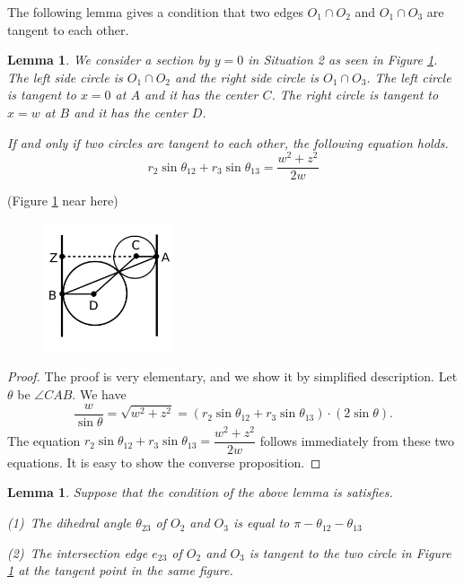 \documentclass[suppldata, dvipdfmx]{interact}
\theoremstyle{plain}%
\newtheorem{lemma}[theorem]{Lemma}
\theoremstyle{definition}
\theoremstyle{remark}
\theoremstyle{problemstyle}
\begin{document}
The following lemma gives a condition that two edges $O_1\cap O_2$ and $O_1\cap O_3$ are tangent to each other. 

\begin{lemma} \label{lemma:twoCirclesChain}
We consider a section by $y=0$ in Situation 2 as seen in Figure \ref{fig:twoCirclesChain}.  The left side circle is $O_1\cap O_2$ and the right side circle is $O_1\cap O_3$.  The left circle is tangent to $x=0$ at $A$ and it has the center $C$.  The right circle is tangent to $x=w$ at $B$ and it has the center $D$. \par
If and only if two circles are tangent to each other, the following equation holds.
\[
r_2\sin\theta_{12}+r_3\sin\theta_{13}=\dfrac{w^2+z^2}{2w}
\]
\end{lemma}

\noindent(Figure \ref{fig:twoCirclesChain} near here)

\begin{figure}[h!tbp]
  \centering
  \includegraphics[width=1.5in, height=1.5in,
  keepaspectratio]{./img/HexahedraWithSphericalFaces/twoCirclesSlice.jpg}
 \caption{}
 \label{fig:twoCirclesChain}
\end{figure}

\begin{proof}
The proof is very elementary, and we show it by simplified description.  Let $\theta$ be $\angle CAB$.  We have
\[
\dfrac{w}{\sin\theta}  = \sqrt{w^2+z^2}
 = (r_2\sin\theta_{12}+r_3\sin\theta_{13})\cdot(2\sin\theta ).
\]
The equation $r_2\sin\theta_{12}+r_3\sin\theta_{13}=\dfrac{w^2+z^2}{2w}$ follows immediately from these two equations.  It is easy to show the converse proposition.
\end{proof}

\begin{lemma} \label{lemma:twoCirclesChainAngle}
Suppose that the condition of the above lemma is satisfies.\par
(1)\ The dihedral angle $\theta_{23}$ of $O_2$ and $O_3$ is equal to $\pi - \theta_{12} - \theta_{13}$ \par
(2)\ The intersection edge $e_{23}$ of $O_2$ and $O_3$ is tangent to the two circle in Figure \ref{fig:twoCirclesChain} at the tangent point in the same figure.
\end{lemma}
\end{document}
